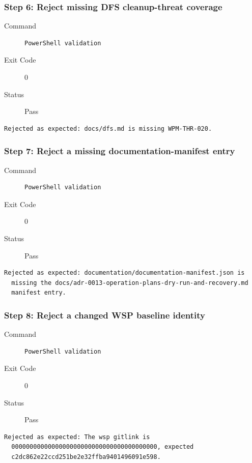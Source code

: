 \subsubsection*{Step 6: Reject missing DFS cleanup-threat coverage}
\begin{description}
\item[Command] \mbox{}
\begin{verbatim}
PowerShell validation
\end{verbatim}
\item[Exit Code] 0
\item[Status] Pass
\end{description}
\begin{verbatim}
Rejected as expected: docs/dfs.md is missing WPM-THR-020.
\end{verbatim}
\subsubsection*{Step 7: Reject a missing documentation-manifest entry}
\begin{description}
\item[Command] \mbox{}
\begin{verbatim}
PowerShell validation
\end{verbatim}
\item[Exit Code] 0
\item[Status] Pass
\end{description}
\begin{verbatim}
Rejected as expected: documentation/documentation-manifest.json is
  missing the docs/adr-0013-operation-plans-dry-run-and-recovery.md
  manifest entry.
\end{verbatim}
\subsubsection*{Step 8: Reject a changed WSP baseline identity}
\begin{description}
\item[Command] \mbox{}
\begin{verbatim}
PowerShell validation
\end{verbatim}
\item[Exit Code] 0
\item[Status] Pass
\end{description}
\begin{verbatim}
Rejected as expected: The wsp gitlink is
  0000000000000000000000000000000000000000, expected
  c2dc862e22ccd251be2e32ffba9401496091e598.
\end{verbatim}

